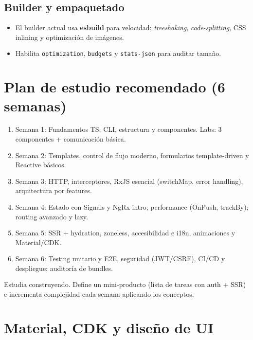 \documentclass[11pt,a4paper]{article}
\begin{document}
\subsection{Builder y empaquetado}
\begin{itemize}[leftmargin=*]
  \item El builder actual usa \textbf{esbuild} para velocidad; \emph{treeshaking}, \emph{code-splitting}, CSS inlining y optimización de imágenes.
  \item Habilita \texttt{optimization}, \texttt{budgets} y \texttt{stats-json} para auditar tamaño.
\end{itemize}

\section{Plan de estudio recomendado (6 semanas)}
\begin{enumerate}[leftmargin=*]
  \item Semana 1: Fundamentos TS, CLI, estructura y componentes. Labs: 3 componentes + comunicación básica.
  \item Semana 2: Templates, control de flujo moderno, formularios template-driven y Reactive básicos.
  \item Semana 3: HTTP, interceptores, RxJS esencial (switchMap, error handling), arquitectura por features.
  \item Semana 4: Estado con Signals y NgRx intro; performance (OnPush, trackBy); routing avanzado y lazy.
  \item Semana 5: SSR + hydration, zoneless, accesibilidad e i18n, animaciones y Material/CDK.
  \item Semana 6: Testing unitario y E2E, seguridad (JWT/CSRF), CI/CD y despliegue; auditoría de bundles.
\end{enumerate}

\begin{tipbox}
Estudia construyendo. Define un mini-producto (lista de tareas con auth + SSR) e incrementa complejidad cada semana aplicando los conceptos.
\end{tipbox}

\section{Material, CDK y diseño de UI}
\end{document}
